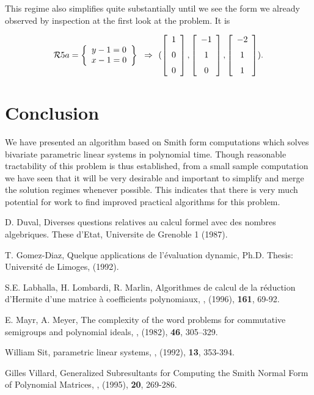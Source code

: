 This regime also simplifies quite substantially until we see the form we already observed
by inspection at the first look at the problem.  It is

\[\RR5a = 
\breg y-1 = 0\\x-1 = 0\ereg \implies
(\left [\begin {array}{c} 1\\\noalign{\medskip}0\\\noalign{\medskip}0
\end {array}\right ]
,%
\left [\begin {array}{c} -1\\\noalign{\medskip}1\\\noalign{\medskip}0
\end {array}\right ]
,%
\left [\begin {array}{c} -2\\\noalign{\medskip}1\\\noalign{\medskip}
1\end {array}\right ]
).
\]

\section{Conclusion}
We have presented an algorithm based on Smith form computations which solves bivariate
parametric linear systems in polynomial time.  Though reasonable tractability of this 
problem is thus established, from a small sample computation we have 
seen that it will be very desirable and important to simplify and merge the solution 
regimes whenever possible.
This indicates that there is very much potential for work to find improved practical 
algorithms for this problem.

\begin{thebibliography}{fourr}

D. Duval,
\newblock  Diverses questions relatives au calcul formel avec des nombres algebriques.
\newblock These d'Etat, Universite de Grenoble 1 
\newblock (1987).

T. Gomez-Diaz,
\newblock Quelque applications de l'\'evaluation dynamic,
\newblock Ph.D. Thesis: Universit\'e de Limoges,
\newblock (1992).

S.E. Labhalla, H. Lombardi, R. Marlin,
\newblock Algorithmes de calcul de la r\'eduction d'Hermite d'une matrice \`a coefficients polynomiaux,
, (1996), {\bf 161}, 69-92.

E. Mayr, A. Meyer,
\newblock The complexity of the word problems for commutative semigroups and polynomial ideals,
, (1982), {\bf 46}, 305--329. 

William Sit,
\newblock parametric linear systems,
, (1992), {\bf 13}, 353-394.

Gilles Villard,
\newblock Generalized Subresultants for Computing the Smith Normal Form of Polynomial Matrices,
, (1995), {\bf 20}, 269-286.


\end{thebibliography}




